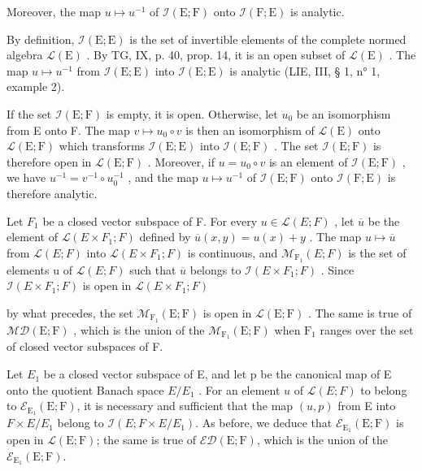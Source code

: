 Moreover, the map \(u \mapsto u^{-1}\) of \(\mathcal{I}(\mathrm{E};\mathrm{F})\) onto \(\mathcal{I}(\mathrm{F};\mathrm{E})\) is analytic.

By definition, \(\mathcal{I}(\mathrm{E};\mathrm{E})\) is the set of invertible elements of the complete normed algebra \(\mathcal{L}(\mathrm{E})\) . By TG, IX, p. 40, prop. 14, it is an open subset of \(\mathcal{L}(\mathrm{E})\) . The map \(u\mapsto u^{-1}\) from \(\mathcal{I}(\mathrm{E};\mathrm{E})\) into \(\mathcal{I}(\mathrm{E};\mathrm{E})\) is analytic (LIE, III, § 1, n° 1, example 2).

If the set \(\mathcal{I}(\mathrm{E};\mathrm{F})\) is empty, it is open. Otherwise, let \(u_0\) be an isomorphism from E onto F. The map \(v\mapsto u_0\circ v\) is then an isomorphism of \(\mathcal{L}(\mathrm{E})\) onto \(\mathcal{L}(\mathrm{E};\mathrm{F})\) which transforms \(\mathcal{I}(\mathrm{E};\mathrm{E})\) into \(\mathcal{I}(\mathrm{E};\mathrm{F})\) . The set \(\mathcal{I}(\mathrm{E};\mathrm{F})\) is therefore open in \(\mathcal{L}(\mathrm{E};\mathrm{F})\) . Moreover, if \(u = u_0\circ v\) is an element of \(\mathcal{I}(\mathrm{E};\mathrm{F})\) , we have \(u^{-1} = v^{-1}\circ u_0^{-1}\) , and the map \(u\mapsto u^{-1}\) of \(\mathcal{I}(\mathrm{E};\mathrm{F})\) onto \(\mathcal{I}(\mathrm{F};\mathrm{E})\) is therefore analytic.

Let \(F_{1}\) be a closed vector subspace of F. For every \(u \in \mathcal{L}(E;F)\) , let \(\overline{u}\) be the element of \(\mathcal{L}(E \times F_{1};F)\) defined by \(\overline{u}(x,y) = u(x) + y\) . The map \(u \mapsto \overline{u}\) from \(\mathcal{L}(E;F)\) into \(\mathcal{L}(E \times F_{1};F)\) is continuous, and \(\mathcal{M}_{\mathrm{F}_{1}}(E;F)\) is the set of elements u of \(\mathcal{L}(E;F)\) such that \(\overline{u}\) belongs to \(\mathcal{I}(E \times F_{1};F)\) . Since \(\mathcal{I}(E \times F_{1};F)\) is open in \(\mathcal{L}(E \times F_{1};F)\)

by what precedes, the set \(\mathcal{M}_{\mathrm{F}_1}(\mathrm{E};\mathrm{F})\) is open in \(\mathcal{L}(\mathrm{E};\mathrm{F})\) . The same is true of \(\mathcal{MD}(\mathrm{E};\mathrm{F})\) , which is the union of the \(\mathcal{M}_{\mathrm{F}_1}(\mathrm{E};\mathrm{F})\) when \(\mathrm{F}_1\) ranges over the set of closed vector subspaces of F.

Let \(E_{1}\) be a closed vector subspace of E, and let p be the canonical map of E onto the quotient Banach space \(E/E_{1}\) . For an element \(u\) of \(\mathcal{L}(E;F)\) to belong to \(\mathcal{E}_{\mathrm{E}_{1}}(\mathrm{E};\mathrm{F})\), it is necessary and sufficient that the map \((u,p)\) from E into \(F\times E/E_{1}\) belong to \(\mathcal{I}(E;F\times E/E_{1})\). As before, we deduce that \(\mathcal{E}_{\mathrm{E}_{1}}(\mathrm{E};\mathrm{F})\) is open in \(\mathcal{L}(\mathrm{E};\mathrm{F})\); the same is true of \(\mathcal{E}\mathcal{D}(\mathrm{E};\mathrm{F})\), which is the union of the \(\mathcal{E}_{\mathrm{E}_{1}}(\mathrm{E};\mathrm{F})\).

